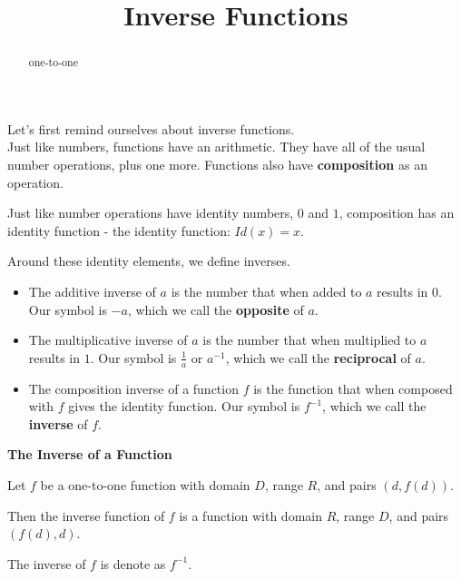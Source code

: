 \documentclass{ximera}
\title{Inverse Functions}
\begin{document}
\begin{abstract}
one-to-one
\end{abstract}
\maketitle


Let's first remind ourselves about inverse functions. \\


Just like numbers, functions have an arithmetic.  They have all of the usual number operations, plus one more.  Functions also have \textbf{\textcolor{purple!85!blue}{composition}} as an operation.

Just like number operations have identity numbers, $0$ and $1$, composition has an identity function - the identity function: $Id(x) = x$.




Around these identity elements, we define inverses.






\begin{itemize}
\item The additive inverse of $a$ is the number that when added to $a$ results in $0$.  Our symbol is $-a$, which we call the \textbf{\textcolor{blue!55!black}{opposite}} of $a$.
\item The multiplicative inverse of $a$ is the number that when multiplied to $a$ results in $1$.  Our symbol is $\frac{1}{a}$ or $a^{-1}$, which we call the \textbf{\textcolor{blue!55!black}{reciprocal}} of $a$.
\item The composition inverse of a function $f$ is the function that when composed with $f$ gives the identity function. Our symbol is $f^{-1}$, which we call the \textbf{\textcolor{blue!55!black}{inverse}} of $f$.
\end{itemize}





\begin{definition} \textbf{\textcolor{green!50!black}{The Inverse of a Function}} 


Let $f$ be a one-to-one function with domain $D$, range $R$, and pairs $(d, f(d))$.

Then the inverse function of $f$ is a function with domain $R$, range $D$, and pairs $(f(d), d)$.


The inverse of $f$ is denote as $f^{-1}$.

\end{definition}
\end{document}
